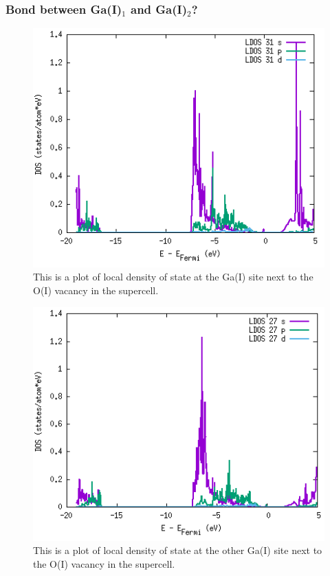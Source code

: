\subsubsection{Bond between Ga(I)$_1$ and Ga(I)$_2$?}

\begin{figure}[H]
\includegraphics[width=\linewidth]{../fig/dosplot/ldos_Ga_I_OI_vac_nabo}\caption{This is a plot of local density of state at the Ga(I) site next to the O(I) vacancy in the supercell.}\label{fig:ldos_Ga_I_nabo}
\end{figure}

\begin{figure}[H]
\includegraphics[width=\linewidth]{../fig/dosplot/ldos_Ga_I_OI_vac_nabo2}\caption{This is a plot of local density of state at the other Ga(I) site next to the O(I) vacancy in the supercell.}\label{fig:ldos_Ga_I_nabo}
\end{figure}

